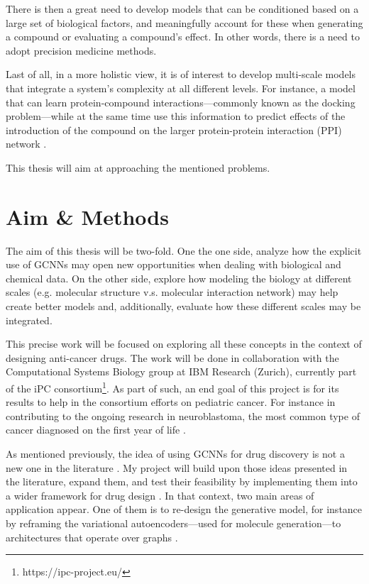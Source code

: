 \documentclass{article}
\begin{document}
There is then a great need to develop models that can be conditioned based on a large
 set of biological factors, and meaningfully account for these when generating a
 compound or evaluating a compound's effect. {\color{red}In other words, there is a need
 to adopt precision medicine methods.}

Last of all, in a more holistic view, it is of interest to develop multi-scale models
 that integrate a system's complexity at all different levels. For instance, a model
 that can learn protein-compound interactions---commonly known as the docking
 problem---while at the same time use this information to predict effects of the
 introduction of the compound on the larger protein-protein interaction (PPI)
 network \cite{Sun2019}.

{\color{red} This thesis will aim at approaching the mentioned problems.}

    \section*{Aim \& Methods}


The aim of this thesis will be two-fold. One the one side, analyze how the explicit use
 of GCNNs may open new opportunities when dealing with biological and chemical data. On
 the other side, explore how modeling the biology at different scales (e.g. molecular
 structure v.s. molecular interaction network) may help create better models and,
 additionally, evaluate how these different scales may be integrated.

This precise work will be focused on exploring all these concepts in the context of
 designing anti-cancer drugs. The work will be done in collaboration with the
 Computational Systems Biology group at IBM Research (Zurich), currently part of the iPC
 consortium\footnote{https://ipc-project.eu/}. As part of such, an end goal of this
 project is for its results to help in the consortium efforts on pediatric cancer. For
 instance in contributing to the ongoing research in neuroblastoma, the most common type
 of cancer diagnosed on the first year of life \cite{Maris2010}.

As mentioned previously, the idea of using GCNNs for drug discovery is not a new one in
 the literature \cite{Sun2019}. My project will build upon those ideas presented in the
 literature, expand them, and test their feasibility by implementing them into a wider
 framework for drug design \cite{Born2019}. In that context, two main areas of
 application appear. One of them is to re-design the generative model, for instance by
 reframing the variational autoencoders---used for molecule generation---to
 architectures that operate over graphs \cite{Simonovsky2018,Li2018, Li2018a}. 
 
\end{document}
